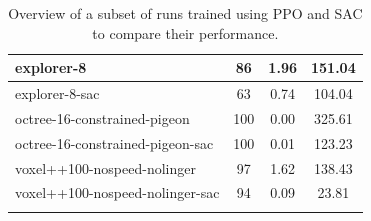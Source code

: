\begin{longtable}{|l|c|c|c|}
 
    {\cellcolor[HTML]{B5C3D7}} \color[HTML]{000000} explorer-8      & {\cellcolor[HTML]{B5C3D7}} \color[HTML]{000000} 86    & {\cellcolor[HTML]{B5C3D7}} \color[HTML]{000000} 1.96 & {\cellcolor[HTML]{B5C3D7}} \color[HTML]{000000} 151.04 \\ \hline       %
    {\cellcolor[HTML]{D7C5AF}} \color[HTML]{000000} explorer-8-sac  & {\cellcolor[HTML]{D7C5AF}} \color[HTML]{000000} 63    & {\cellcolor[HTML]{D7C5AF}} \color[HTML]{000000} 0.74 & {\cellcolor[HTML]{D7C5AF}} \color[HTML]{000000} 104.04 \\ \hline       %
    {\cellcolor[HTML]{B5C3D7}} \color[HTML]{000000} octree-16-constrained-pigeon        & {\cellcolor[HTML]{B5C3D7}} \color[HTML]{000000} 100 & {\cellcolor[HTML]{B5C3D7}} \color[HTML]{000000} 0.00  & {\cellcolor[HTML]{B5C3D7}} \color[HTML]{000000} 325.61   \\ \hline   %
    {\cellcolor[HTML]{D7C5AF}} \color[HTML]{000000} octree-16-constrained-pigeon-sac    & {\cellcolor[HTML]{D7C5AF}} \color[HTML]{000000} 100   & {\cellcolor[HTML]{D7C5AF}} \color[HTML]{000000} 0.01  & {\cellcolor[HTML]{D7C5AF}} \color[HTML]{000000} 123.23 \\ \hline      %
    {\cellcolor[HTML]{B5C3D7}} \color[HTML]{000000} voxel++100-nospeed-nolinger         & {\cellcolor[HTML]{B5C3D7}} \color[HTML]{000000} 97    & {\cellcolor[HTML]{B5C3D7}} \color[HTML]{000000} 1.62  & {\cellcolor[HTML]{B5C3D7}} \color[HTML]{000000} 138.43  \\ \hline      %
    {\cellcolor[HTML]{D7C5AF}} \color[HTML]{000000}  voxel++100-nospeed-nolinger-sac    & {\cellcolor[HTML]{D7C5AF}} \color[HTML]{000000} 94    & {\cellcolor[HTML]{D7C5AF}} \color[HTML]{000000} 0.09  & {\cellcolor[HTML]{D7C5AF}} \color[HTML]{000000} 23.81 \\ \hline       %

    \caption{Overview of a subset of runs trained using PPO and SAC to compare their performance.
    }
    \label{tab:results-SAC}
\end{longtable}








